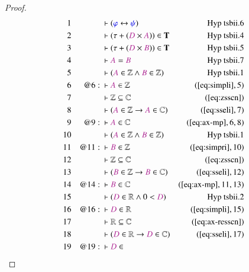 \begin{proof}
\begin{align}
  1 &&  & \vdash ( \mw{\varphi} \leftrightarrow \mw{\psi}
      )&\text{Hyp~tsbii.6}\notag%
  \\ 2 &&  & \vdash ( \tau + ( \mc{D} \times \mc{A} ) ) \in
      \mathbf{T}&\text{Hyp~tsbii.4}\notag%
  \\ 3 &&  & \vdash ( \tau + ( \mc{D} \times \mc{B} ) ) \in
      \mathbf{T}&\text{Hyp~tsbii.5}\notag%
  \\ 4 &&  & \vdash \mc{A} = \mc{B}&\text{Hyp~tsbii.7}\notag%
  \\ 5 &&  & \vdash ( \mc{A} \in \mathbb{Z} \wedge \mc{B} \in \mathbb{Z}
      )&\text{Hyp~tsbii.1}\notag%
  \\ 6 && @6:\  & \vdash \mc{A} \in \mathbb{Z}&(\mbox{\ref{eq:simpli}},5)\notag
  \\ 7 &&  & \vdash \mathbb{Z} \subseteq
      \mathbb{C}&(\mbox{\ref{eq:zsscn}})\notag
  \\ 8 &&  & \vdash ( \mc{A} \in \mathbb{Z} \rightarrow \mc{A} \in \mathbb{C}
      )&(\mbox{\ref{eq:sseli}},7)\notag
  \\ 9 && @9:\  & \vdash \mc{A} \in
      \mathbb{C}&(\mbox{\ref{eq:ax-mp}},6,8)\notag
  \\ 10 &&  & \vdash ( \mc{A} \in \mathbb{Z} \wedge \mc{B} \in \mathbb{Z}
      )&\text{Hyp~tsbii.1}\notag%
  \\ 11 && @11:\  & \vdash \mc{B} \in
      \mathbb{Z}&(\mbox{\ref{eq:simpri}},10)\notag
  \\ 12 &&  & \vdash \mathbb{Z} \subseteq
      \mathbb{C}&(\mbox{\ref{eq:zsscn}})\notag
  \\ 13 &&  & \vdash ( \mc{B} \in \mathbb{Z} \rightarrow \mc{B} \in \mathbb{C}
      )&(\mbox{\ref{eq:sseli}},12)\notag
  \\ 14 && @14:\  & \vdash \mc{B} \in
      \mathbb{C}&(\mbox{\ref{eq:ax-mp}},11,13)\notag
  \\ 15 &&  & \vdash ( \mc{D} \in \mathbb{R} \wedge 0 < \mc{D}
      )&\text{Hyp~tsbii.2}\notag%
  \\ 16 && @16:\  & \vdash \mc{D} \in
      \mathbb{R}&(\mbox{\ref{eq:simpli}},15)\notag
  \\ 17 &&  & \vdash \mathbb{R} \subseteq
      \mathbb{C}&(\mbox{\ref{eq:ax-resscn}})\notag
  \\ 18 &&  & \vdash ( \mc{D} \in \mathbb{R} \rightarrow \mc{D} \in \mathbb{C}
      )&(\mbox{\ref{eq:sseli}},17)\notag
  \\ 19 && @19:\  & \vdash \mc{D} \in

\end{align}
\end{proof}

